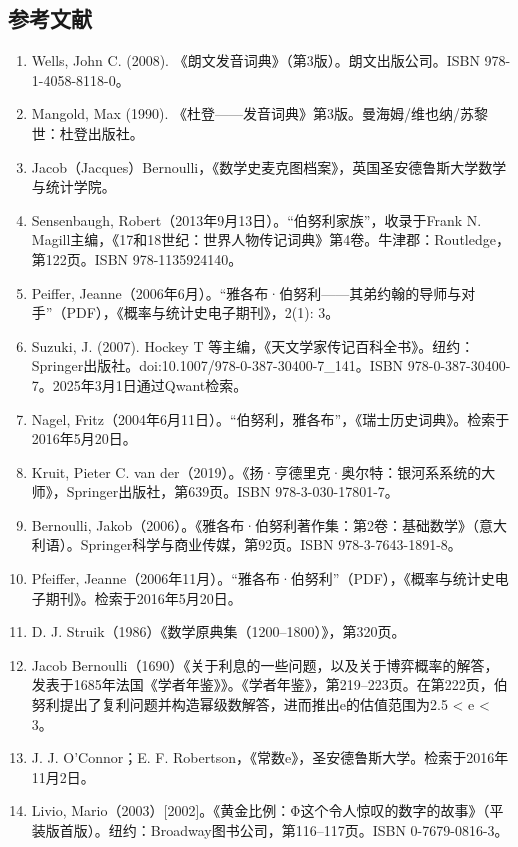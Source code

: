 \subsection{参考文献}
\begin{enumerate}
\item Wells, John C. (2008). 《朗文发音词典》（第3版）。朗文出版公司。ISBN 978-1-4058-8118-0。
\item Mangold, Max (1990). 《杜登——发音词典》第3版。曼海姆/维也纳/苏黎世：杜登出版社。
\item Jacob（Jacques）Bernoulli，《数学史麦克图档案》，英国圣安德鲁斯大学数学与统计学院。
\item Sensenbaugh, Robert（2013年9月13日）。“伯努利家族”，收录于Frank N. Magill主编，《17和18世纪：世界人物传记词典》第4卷。牛津郡：Routledge，第122页。ISBN 978-1135924140。
\item Peiffer, Jeanne（2006年6月）。“雅各布·伯努利——其弟约翰的导师与对手”（PDF），《概率与统计史电子期刊》，2(1): 3。
\item Suzuki, J. (2007). Hockey T 等主编，《天文学家传记百科全书》。纽约：Springer出版社。doi:10.1007/978-0-387-30400-7\_141。ISBN 978-0-387-30400-7。2025年3月1日通过Qwant检索。
\item Nagel, Fritz（2004年6月11日）。“伯努利，雅各布”，《瑞士历史词典》。检索于2016年5月20日。
\item Kruit, Pieter C. van der（2019）。《扬·亨德里克·奥尔特：银河系系统的大师》，Springer出版社，第639页。ISBN 978-3-030-17801-7。
\item Bernoulli, Jakob（2006）。《雅各布·伯努利著作集：第2卷：基础数学》（意大利语）。Springer科学与商业传媒，第92页。ISBN 978-3-7643-1891-8。
\item Pfeiffer, Jeanne（2006年11月）。“雅各布·伯努利”（PDF），《概率与统计史电子期刊》。检索于2016年5月20日。
\item D. J. Struik（1986）《数学原典集（1200–1800）》，第320页。
\item Jacob Bernoulli（1690）《关于利息的一些问题，以及关于博弈概率的解答，发表于1685年法国《学者年鉴》》。《学者年鉴》，第219–223页。在第222页，伯努利提出了复利问题并构造幂级数解答，进而推出e的估值范围为2.5 < e < 3。
\item J. J. O'Connor；E. F. Robertson，《常数e》，圣安德鲁斯大学。检索于2016年11月2日。
\item Livio, Mario（2003）[2002]。《黄金比例：Φ这个令人惊叹的数字的故事》（平装版首版）。纽约：Broadway图书公司，第116–117页。ISBN 0-7679-0816-3。
\end{enumerate}
